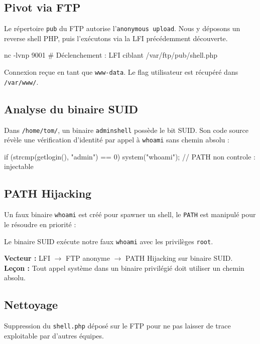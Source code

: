 \documentclass[11pt,a4paper]{article}
\begin{document}
\subsection{Pivot via FTP}
Le répertoire \texttt{pub} du FTP autorise l'\texttt{anonymous upload}. Nous y déposons un reverse shell PHP, puis l'exécutons via la LFI précédemment découverte.

\begin{shellbox}
nc -lvnp 9001
# Déclenchement : LFI ciblant /var/ftp/pub/shell.php
\end{shellbox}

Connexion reçue en tant que \texttt{www-data}. Le flag utilisateur est récupéré dans \texttt{/var/www/}.

\subsection{Analyse du binaire SUID}
Dans \texttt{/home/tom/}, un binaire \texttt{adminshell} possède le bit SUID. Son code source révèle une vérification d'identité par appel à \texttt{whoami} sans chemin absolu :

\begin{shellbox}[listing options={style=terminal,language=C}]
if (strcmp(getlogin(), "admin") == 0) {
    system("whoami");  // PATH non controle : injectable
}
\end{shellbox}

\subsection{PATH Hijacking}
Un faux binaire \texttt{whoami} est créé pour spawner un shell, le \texttt{PATH} est manipulé pour le résoudre en priorité :

Le binaire SUID exécute notre faux \texttt{whoami} avec les privilèges \texttt{root}.

\begin{flagbox}[title={\faFlag~Machine 4 compromise — root obtenu}]
\textbf{Vecteur :} LFI \(\rightarrow\) FTP anonyme \(\rightarrow\) PATH Hijacking sur binaire SUID.\\
\textbf{Leçon :} Tout appel système dans un binaire privilégié doit utiliser un chemin absolu.
\end{flagbox}

\subsection{Nettoyage}
Suppression du \texttt{shell.php} déposé sur le FTP pour ne pas laisser de trace exploitable par d'autres équipes.
\end{document}
